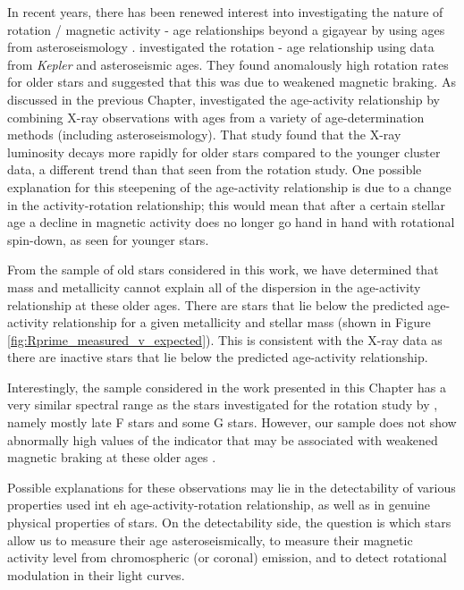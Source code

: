 In recent years, there has been renewed interest into investigating the nature of rotation / magnetic activity - age relationships beyond a gigayear by using ages from asteroseismology \citep{van_Saders_etal_2016,Booth_etal_2017}. \citet{van_Saders_etal_2016} investigated the rotation - age relationship using data from \textit{Kepler} and asteroseismic ages. They found anomalously high rotation rates for older stars and suggested that this was due to weakened magnetic braking. As discussed in the previous Chapter, \citet{Booth_etal_2017} investigated the age-activity relationship by combining X-ray observations with ages from a variety of age-determination methods (including asteroseismology). That study found that the X-ray luminosity decays more rapidly for older stars compared to the younger cluster data, a different trend than that seen from the rotation study. One possible explanation for this steepening of the age-activity relationship is due to a change in the activity-rotation relationship; this would mean that after a certain stellar age a decline in magnetic activity does no longer go hand in hand with rotational spin-down, as seen for younger stars.

From the sample of old stars considered in this work, we have determined that mass and metallicity cannot explain all of the dispersion in the age-activity relationship at these older ages. There are stars that lie below the predicted age-activity relationship for a given metallicity and stellar mass (shown in Figure \ref{fig:Rprime_measured_v_expected}). This is consistent with the X-ray data \citep{Booth_etal_2017} as there are inactive stars that lie below the predicted age-activity relationship.

Interestingly, the sample considered in the work presented in this Chapter has a very similar spectral range as the stars investigated for the rotation study by \citet{van_Saders_etal_2016}, namely mostly late F stars and some G stars. However, our sample does not show abnormally high values of the \Rprime indicator that may be associated with weakened magnetic braking at these older ages \citep{van_Saders_etal_2016}.

Possible explanations for these observations may lie in the detectability of various properties used int eh age-activity-rotation relationship, as well as in genuine physical properties of stars. On the detectability side, the question is which stars allow us to measure their age asteroseismically, to measure their magnetic activity level from chromospheric (or coronal) emission, and to detect rotational modulation in their light curves.


